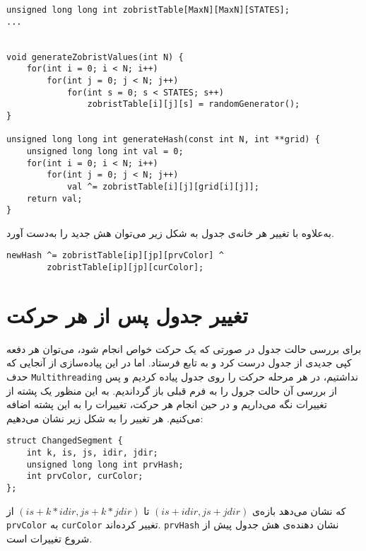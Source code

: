 \lstset{language=C++}
\begin{latin}
\begin{lstlisting}
unsigned long long int zobristTable[MaxN][MaxN][STATES];
...


void generateZobristValues(int N) {
	for(int i = 0; i < N; i++)
		for(int j = 0; j < N; j++)
			for(int s = 0; s < STATES; s++)
				zobristTable[i][j][s] = randomGenerator();
}

unsigned long long int generateHash(const int N, int **grid) {
	unsigned long long int val = 0;
	for(int i = 0; i < N; i++)
		for(int j = 0; j < N; j++)
			val ^= zobristTable[i][j][grid[i][j]];
	return val;
}

\end{lstlisting}
\end{latin}

به‌علاوه با تغییر هر خانه‌ی جدول به شکل زیر می‌توان هش جدید را به‌دست آورد.

\begin{latin}
\begin{lstlisting}
newHash ^= zobristTable[ip][jp][prvColor] ^ 
		zobristTable[ip][jp][curColor];

\end{lstlisting}
\end{latin}

\section{تغییر جدول پس از هر حرکت}
برای بررسی حالت جدول در صورتی که یک حرکت خواص انجام شود، می‌توان هر دفعه کپی جدیدی از جدول درست کرد و به تابع فرستاد. اما در این پیاده‌سازی از آنجایی که حدف
\verb;Multithreading;
نداشتیم، در هر مرحله حرکت را روی جدول پیاده کردیم و پس از بررسی آن حالت جرول را به فرم قبلی باز گرداندیم.
به این منظور یک پشته
از تغییرات نگه می‌داریم و  در حین انجام هر حرکت، تغییرات را به این پشته اضافه می‌کنیم.
هر تغییر را به شکل زیر نشان می‌دهیم:

\begin{latin}
\begin{lstlisting}
struct ChangedSegment {
	int k, is, js, idir, jdir;
	unsigned long long int prvHash;
	int prvColor, curColor;
};
\end{lstlisting}
\end{latin}

که نشان می‌دهد بازه‌ی
$(is + idir, js + jdir)$
تا
$(is + k * idir, js + k * jdir)$
از
\verb;prvColor;
به
\verb;curColor;
تغییر کرده‌اند.
\verb;prvHash;
نشان دهنده‌ی هش جدول پیش از شروع تغییرات است.

